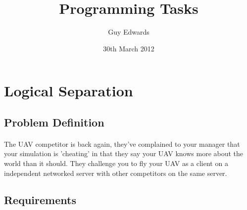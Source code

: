 \documentclass[11pt]{book}
\title{\textbf{Programming Tasks}}
\author{Guy Edwards}
\date{30th March 2012}
\begin{document}
\section{Logical Separation}

\subsection{Problem Definition}

\paragraph{} The UAV competitor is back again, they've complained to your
manager that your simulation is 'cheating' in that they say your UAV knows
more about the world than it should. They challenge you to fly your UAV as a
client on a independent networked server with other competitors on the same
server.

\subsection{Requirements}
\end{document}
